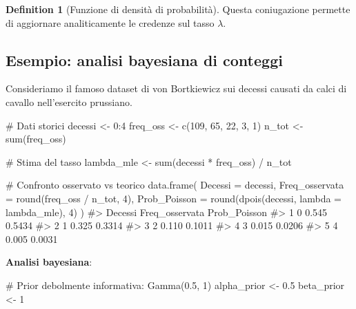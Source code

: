\documentclass[
  letterpaper,
  DIV=11,
  numbers=noendperiod,
  oneside]{scrreprt}
\newenvironment{Shaded}{\begin{snugshade}}{\end{snugshade}}
\newcommand{\AttributeTok}[1]{\textcolor[rgb]{0.40,0.45,0.13}{#1}}
\newcommand{\CommentTok}[1]{\textcolor[rgb]{0.37,0.37,0.37}{#1}}
\newcommand{\DecValTok}[1]{\textcolor[rgb]{0.68,0.00,0.00}{#1}}
\newcommand{\FloatTok}[1]{\textcolor[rgb]{0.68,0.00,0.00}{#1}}
\newcommand{\FunctionTok}[1]{\textcolor[rgb]{0.28,0.35,0.67}{#1}}
\newcommand{\NormalTok}[1]{\textcolor[rgb]{0.00,0.23,0.31}{#1}}
\newcommand{\OtherTok}[1]{\textcolor[rgb]{0.00,0.23,0.31}{#1}}
\newcommand{\SpecialCharTok}[1]{\textcolor[rgb]{0.37,0.37,0.37}{#1}}
\theoremstyle{definition}
\theoremstyle{plain}
\theoremstyle{definition}
\newtheorem{definition}{Definition}[chapter]
\theoremstyle{remark}
\begin{document}
\begin{definition}[Funzione di densità di
probabilità]
Questa coniugazione permette di aggiornare analiticamente le credenze
sul tasso \(\lambda\).

\subsection{Esempio: analisi bayesiana di
conteggi}\label{esempio-analisi-bayesiana-di-conteggi}

Consideriamo il famoso dataset di von Bortkiewicz sui decessi causati da
calci di cavallo nell'esercito prussiano.

\begin{Shaded}
\begin{Highlighting}[]
\CommentTok{\# Dati storici}
\NormalTok{decessi }\OtherTok{\textless{}{-}} \DecValTok{0}\SpecialCharTok{:}\DecValTok{4}
\NormalTok{freq\_oss }\OtherTok{\textless{}{-}} \FunctionTok{c}\NormalTok{(}\DecValTok{109}\NormalTok{, }\DecValTok{65}\NormalTok{, }\DecValTok{22}\NormalTok{, }\DecValTok{3}\NormalTok{, }\DecValTok{1}\NormalTok{)}
\NormalTok{n\_tot }\OtherTok{\textless{}{-}} \FunctionTok{sum}\NormalTok{(freq\_oss)}

\CommentTok{\# Stima del tasso}
\NormalTok{lambda\_mle }\OtherTok{\textless{}{-}} \FunctionTok{sum}\NormalTok{(decessi }\SpecialCharTok{*}\NormalTok{ freq\_oss) }\SpecialCharTok{/}\NormalTok{ n\_tot}

\CommentTok{\# Confronto osservato vs teorico}
\FunctionTok{data.frame}\NormalTok{(}
  \AttributeTok{Decessi =}\NormalTok{ decessi,}
  \AttributeTok{Freq\_osservata =} \FunctionTok{round}\NormalTok{(freq\_oss }\SpecialCharTok{/}\NormalTok{ n\_tot, }\DecValTok{4}\NormalTok{),}
  \AttributeTok{Prob\_Poisson =} \FunctionTok{round}\NormalTok{(}\FunctionTok{dpois}\NormalTok{(decessi, }\AttributeTok{lambda =}\NormalTok{ lambda\_mle), }\DecValTok{4}\NormalTok{)}
\NormalTok{)}
\CommentTok{\#\textgreater{}   Decessi Freq\_osservata Prob\_Poisson}
\CommentTok{\#\textgreater{} 1       0          0.545       0.5434}
\CommentTok{\#\textgreater{} 2       1          0.325       0.3314}
\CommentTok{\#\textgreater{} 3       2          0.110       0.1011}
\CommentTok{\#\textgreater{} 4       3          0.015       0.0206}
\CommentTok{\#\textgreater{} 5       4          0.005       0.0031}
\end{Highlighting}
\end{Shaded}

\textbf{Analisi bayesiana}:

\begin{Shaded}
\begin{Highlighting}[]
\CommentTok{\# Prior debolmente informativa: Gamma(0.5, 1)}
\NormalTok{alpha\_prior }\OtherTok{\textless{}{-}} \FloatTok{0.5}
\NormalTok{beta\_prior }\OtherTok{\textless{}{-}} \DecValTok{1}


\end{Highlighting}
\end{Shaded}
\end{definition}
\end{document}

